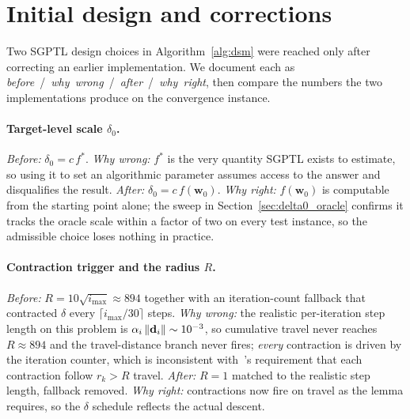 \section{Initial design and corrections}
\label{sec:initial_design}
Two SGPTL design choices in Algorithm~\ref{alg:dsm} were reached only
after correcting an earlier implementation. We document each as
\emph{before}~/~\emph{why~wrong}~/~\emph{after}~/~\emph{why~right}, then
compare the numbers the two implementations produce on the convergence
instance.

\paragraph{Target-level scale $\delta_{0}$.}
\emph{Before:} $\delta_{0}=c\,f^{*}$.
\emph{Why wrong:} $f^{*}$ is the very quantity SGPTL exists to estimate,
so using it to set an algorithmic parameter assumes access to the answer
and disqualifies the result.
\emph{After:} $\delta_{0}=c\,f(\mathbf{w}_{0})$.
\emph{Why right:} $f(\mathbf{w}_{0})$ is computable from the starting
point alone; the sweep in Section~\ref{sec:delta0_oracle} confirms it
tracks the oracle scale within a factor of two on every test instance,
so the admissible choice loses nothing in practice.

\paragraph{Contraction trigger and the radius $R$.}
\emph{Before:} $R=10\sqrt{i_{\max}}\!\approx\!894$ together with an
iteration-count fallback that contracted $\delta$ every
$\lceil i_{\max}/30\rceil$ steps.
\emph{Why wrong:} the realistic per-iteration step length on this
problem is $\alpha_{i}\left\lVert \mathbf{d}_{i} \right\rVert\sim 10^{-3}$, so cumulative
travel never reaches $R\!\approx\!894$ and the travel-distance branch
never fires; \emph{every} contraction is driven by the iteration
counter, which is inconsistent
with~\cite[Lemma~3.8]{dantonio2009deflected}'s requirement that each
contraction follow $r_{k}>R$ travel.
\emph{After:} $R=1$ matched to the realistic step length, fallback
removed.
\emph{Why right:} contractions now fire on travel as the lemma
requires, so the $\delta$ schedule reflects the actual descent.

